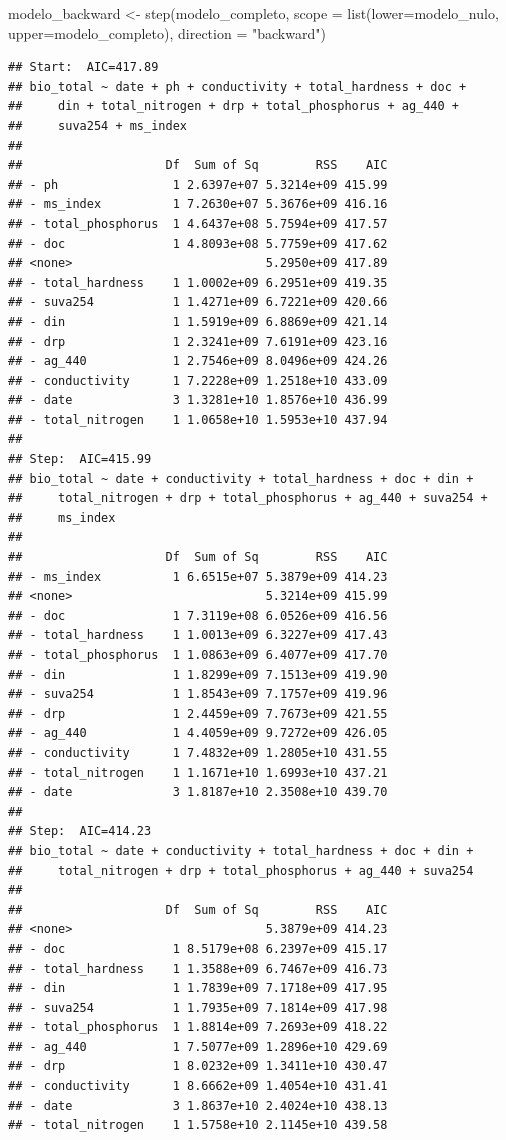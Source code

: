 \documentclass[
]{book}
\newenvironment{Shaded}{\begin{snugshade}}{\end{snugshade}}
\newcommand{\AttributeTok}[1]{\textcolor[rgb]{0.77,0.63,0.00}{#1}}
\newcommand{\FunctionTok}[1]{\textcolor[rgb]{0.00,0.00,0.00}{#1}}
\newcommand{\NormalTok}[1]{#1}
\newcommand{\OtherTok}[1]{\textcolor[rgb]{0.56,0.35,0.01}{#1}}
\newcommand{\StringTok}[1]{\textcolor[rgb]{0.31,0.60,0.02}{#1}}
\begin{document}
\begin{Shaded}
\begin{Highlighting}[]
\NormalTok{modelo\_backward }\OtherTok{\textless{}{-}} \FunctionTok{step}\NormalTok{(modelo\_completo, }\AttributeTok{scope =} \FunctionTok{list}\NormalTok{(}\AttributeTok{lower=}\NormalTok{modelo\_nulo, }\AttributeTok{upper=}\NormalTok{modelo\_completo), }\AttributeTok{direction =} \StringTok{"backward"}\NormalTok{)}
\end{Highlighting}
\end{Shaded}

\begin{verbatim}
## Start:  AIC=417.89
## bio_total ~ date + ph + conductivity + total_hardness + doc + 
##     din + total_nitrogen + drp + total_phosphorus + ag_440 + 
##     suva254 + ms_index
## 
##                    Df  Sum of Sq        RSS    AIC
## - ph                1 2.6397e+07 5.3214e+09 415.99
## - ms_index          1 7.2630e+07 5.3676e+09 416.16
## - total_phosphorus  1 4.6437e+08 5.7594e+09 417.57
## - doc               1 4.8093e+08 5.7759e+09 417.62
## <none>                           5.2950e+09 417.89
## - total_hardness    1 1.0002e+09 6.2951e+09 419.35
## - suva254           1 1.4271e+09 6.7221e+09 420.66
## - din               1 1.5919e+09 6.8869e+09 421.14
## - drp               1 2.3241e+09 7.6191e+09 423.16
## - ag_440            1 2.7546e+09 8.0496e+09 424.26
## - conductivity      1 7.2228e+09 1.2518e+10 433.09
## - date              3 1.3281e+10 1.8576e+10 436.99
## - total_nitrogen    1 1.0658e+10 1.5953e+10 437.94
## 
## Step:  AIC=415.99
## bio_total ~ date + conductivity + total_hardness + doc + din + 
##     total_nitrogen + drp + total_phosphorus + ag_440 + suva254 + 
##     ms_index
## 
##                    Df  Sum of Sq        RSS    AIC
## - ms_index          1 6.6515e+07 5.3879e+09 414.23
## <none>                           5.3214e+09 415.99
## - doc               1 7.3119e+08 6.0526e+09 416.56
## - total_hardness    1 1.0013e+09 6.3227e+09 417.43
## - total_phosphorus  1 1.0863e+09 6.4077e+09 417.70
## - din               1 1.8299e+09 7.1513e+09 419.90
## - suva254           1 1.8543e+09 7.1757e+09 419.96
## - drp               1 2.4459e+09 7.7673e+09 421.55
## - ag_440            1 4.4059e+09 9.7272e+09 426.05
## - conductivity      1 7.4832e+09 1.2805e+10 431.55
## - total_nitrogen    1 1.1671e+10 1.6993e+10 437.21
## - date              3 1.8187e+10 2.3508e+10 439.70
## 
## Step:  AIC=414.23
## bio_total ~ date + conductivity + total_hardness + doc + din + 
##     total_nitrogen + drp + total_phosphorus + ag_440 + suva254
## 
##                    Df  Sum of Sq        RSS    AIC
## <none>                           5.3879e+09 414.23
## - doc               1 8.5179e+08 6.2397e+09 415.17
## - total_hardness    1 1.3588e+09 6.7467e+09 416.73
## - din               1 1.7839e+09 7.1718e+09 417.95
## - suva254           1 1.7935e+09 7.1814e+09 417.98
## - total_phosphorus  1 1.8814e+09 7.2693e+09 418.22
## - ag_440            1 7.5077e+09 1.2896e+10 429.69
## - drp               1 8.0232e+09 1.3411e+10 430.47
## - conductivity      1 8.6662e+09 1.4054e+10 431.41
## - date              3 1.8637e+10 2.4024e+10 438.13
## - total_nitrogen    1 1.5758e+10 2.1145e+10 439.58
\end{verbatim}
\end{document}
